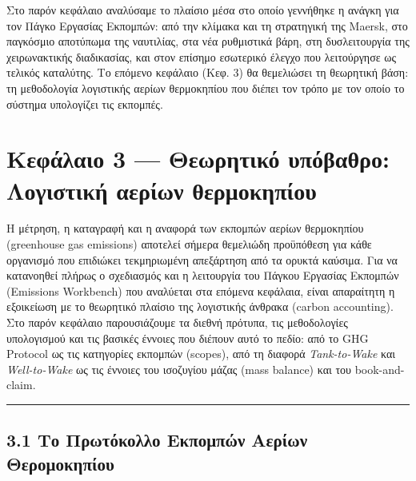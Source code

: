 \documentclass[11pt,a4paper,greek,twoside]{template-xe}
\begin{document}
Στο παρόν κεφάλαιο αναλύσαμε το πλαίσιο μέσα στο οποίο γεννήθηκε η
ανάγκη για τον Πάγκο Εργασίας Εκπομπών: από την κλίμακα και τη
στρατηγική της Maersk, στο παγκόσμιο αποτύπωμα της ναυτιλίας, στα νέα
ρυθμιστικά βάρη, στη δυσλειτουργία της χειρωνακτικής διαδικασίας, και
στον επίσημο εσωτερικό έλεγχο που λειτούργησε ως τελικός καταλύτης. Το
επόμενο κεφάλαιο (Κεφ. 3) θα θεμελιώσει τη θεωρητική βάση: τη
μεθοδολογία λογιστικής αερίων θερμοκηπίου που διέπει τον τρόπο με τον
οποίο το σύστημα υπολογίζει τις εκπομπές.

\pagebreak

\chapter{Κεφάλαιο 3 --- Θεωρητικό υπόβαθρο: Λογιστική αερίων
θερμοκηπίου}\label{ux3baux3b5ux3c6ux3acux3bbux3b1ux3b9ux3bf-3-ux3b8ux3b5ux3c9ux3c1ux3b7ux3c4ux3b9ux3baux3cc-ux3c5ux3c0ux3ccux3b2ux3b1ux3b8ux3c1ux3bf-ux3bbux3bfux3b3ux3b9ux3c3ux3c4ux3b9ux3baux3ae-ux3b1ux3b5ux3c1ux3afux3c9ux3bd-ux3b8ux3b5ux3c1ux3bcux3bfux3baux3b7ux3c0ux3afux3bfux3c5}

Η μέτρηση, η καταγραφή και η αναφορά των εκπομπών αερίων θερμοκηπίου
(greenhouse gas emissions) αποτελεί σήμερα θεμελιώδη προϋπόθεση για κάθε
οργανισμό που επιδιώκει τεκμηριωμένη απεξάρτηση από τα ορυκτά καύσιμα.
Για να κατανοηθεί πλήρως ο σχεδιασμός και η λειτουργία του Πάγκου
Εργασίας Εκπομπών (Emissions Workbench) που αναλύεται στα επόμενα
κεφάλαια, είναι απαραίτητη η εξοικείωση με το θεωρητικό πλαίσιο της
λογιστικής άνθρακα (carbon accounting). Στο παρόν κεφάλαιο παρουσιάζουμε
τα διεθνή πρότυπα, τις μεθοδολογίες υπολογισμού και τις βασικές έννοιες
που διέπουν αυτό το πεδίο: από το GHG Protocol ως τις κατηγορίες
εκπομπών (scopes), από τη διαφορά \emph{Tank-to-Wake} και
\emph{Well-to-Wake} ως τις έννοιες του ισοζυγίου μάζας (mass balance)
και του book-and-claim.

\begin{center}\rule{0.5\linewidth}{0.5pt}\end{center}

\section{3.1 Το Πρωτόκολλο Εκπομπών Αερίων
Θερομοκηπίου}\label{ux3c4ux3bf-ux3c0ux3c1ux3c9ux3c4ux3ccux3baux3bfux3bbux3bbux3bf-ux3b5ux3baux3c0ux3bfux3bcux3c0ux3ceux3bd-ux3b1ux3b5ux3c1ux3afux3c9ux3bd-ux3b8ux3b5ux3c1ux3bfux3bcux3bfux3baux3b7ux3c0ux3afux3bfux3c5}
\end{document}
